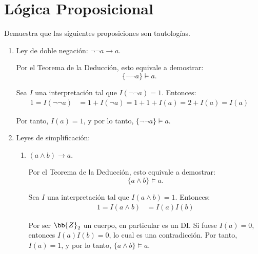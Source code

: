 \section{Lógica Proposicional}

\begin{comment}
\setcounter{ejercicio}{0}
\begin{ejercicio}\label{ej:1.1}
    Demuestra que el conjunto de proposiciones es numerable.
\end{ejercicio}
\end{comment}

\setcounter{ejercicio}{1}
\begin{ejercicio}\label{ej:1.2}
    Demuestra que las siguientes proposiciones son tautologías.
    \begin{enumerate}
        \item Ley de doble negación: $\neg\neg a \rightarrow a$.
        
        Por el Teorema de la Deducción, esto equivale a demostrar:
        \begin{equation*}
            \{\neg\neg a\} \vDash a.
        \end{equation*}

        Sea $I$ una interpretación tal que $I(\neg\neg a) = 1$. Entonces:
        \begin{align*}
            1=I(\neg\neg a) &= 1 + I(\neg a) = 1+1+I(a) = 2+I(a) = I(a)
        \end{align*}

        Por tanto, $I(a) = 1$, y por lo tanto, $\{\neg\neg a\} \vDash a$.
        \item Leyes de simplificación:
        \begin{enumerate}
            \item $(a\land b) \rightarrow a$.
            
            Por el Teorema de la Deducción, esto equivale a demostrar:
            \begin{equation*}
                \{a\land b\} \vDash a.
            \end{equation*}

            Sea $I$ una interpretación tal que $I(a\land b) = 1$. Entonces:
            \begin{align*}
                1=I(a\land b) &= I(a)I(b)
            \end{align*}
            
            Por ser $\bb{Z}_2$ un cuerpo, en particular es un DI. Si fuese $I(a) = 0$, entonces $I(a)I(b) = 0$, lo cual es una contradicción. Por tanto, $I(a) = 1$, y por lo tanto, $\{a\land b\} \vDash a$.



\end{enumerate}
\end{enumerate}
\end{ejercicio}
